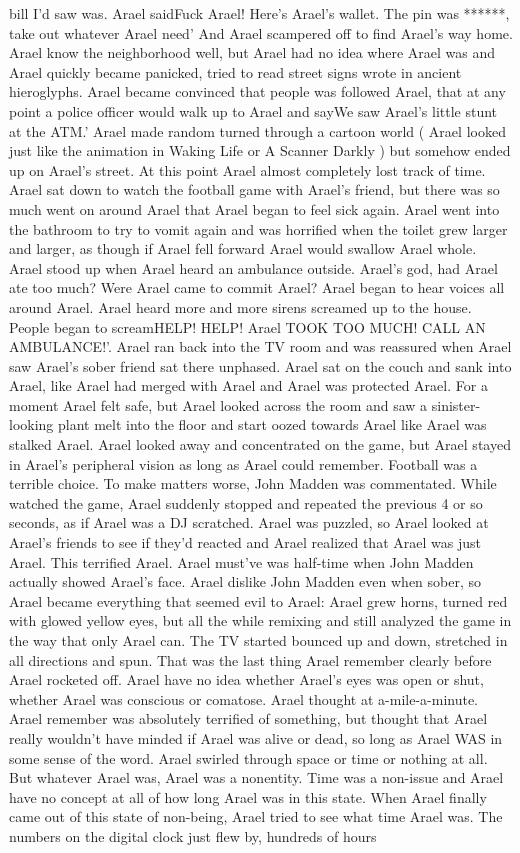 \documentclass[12pt]{book}
\begin{document}
bill I'd saw was. Arael saidFuck Arael! Here's Arael's wallet. The pin was ******, take out whatever Arael need' And Arael scampered off to find Arael's way home. Arael know the neighborhood well, but Arael had no idea where Arael was and Arael quickly became panicked, tried to read street signs wrote in ancient hieroglyphs. Arael became convinced that people was followed Arael, that at any point a police officer would walk up to Arael and sayWe saw Arael's little stunt at the ATM.' Arael made random turned through a cartoon world ( Arael looked just like the animation in Waking Life or A Scanner Darkly ) but somehow ended up on Arael's street. At this point Arael almost completely lost track of time. Arael sat down to watch the football game with Arael's friend, but there was so much went on around Arael that Arael began to feel sick again. Arael went into the bathroom to try to vomit again and was horrified when the toilet grew larger and larger, as though if Arael fell forward Arael would swallow Arael whole. Arael stood up when Arael heard an ambulance outside. Arael's god, had Arael ate too much? Were Arael came to commit Arael? Arael began to hear voices all around Arael. Arael heard more and more sirens screamed up to the house. People began to screamHELP! HELP! Arael TOOK TOO MUCH! CALL AN AMBULANCE!'. Arael ran back into the TV room and was reassured when Arael saw Arael's sober friend sat there unphased. Arael sat on the couch and sank into Arael, like Arael had merged with Arael and Arael was protected Arael. For a moment Arael felt safe, but Arael looked across the room and saw a sinister-looking plant melt into the floor and start oozed towards Arael like Arael was stalked Arael. Arael looked away and concentrated on the game, but Arael stayed in Arael's peripheral vision as long as Arael could remember. Football was a terrible choice. To make matters worse, John Madden was commentated. While watched the game, Arael suddenly stopped and repeated the previous 4 or so seconds, as if Arael was a DJ scratched. Arael was puzzled, so Arael looked at Arael's friends to see if they'd reacted and Arael realized that Arael was just Arael. This terrified Arael. Arael must've was half-time when John Madden actually showed Arael's face. Arael dislike John Madden even when sober, so Arael became everything that seemed evil to Arael: Arael grew horns, turned red with glowed yellow eyes, but all the while remixing and still analyzed the game in the way that only Arael can. The TV started bounced up and down, stretched in all directions and spun. That was the last thing Arael remember clearly before Arael rocketed off. Arael have no idea whether Arael's eyes was open or shut, whether Arael was conscious or comatose. Arael thought at a-mile-a-minute. Arael remember was absolutely terrified of something, but thought that Arael really wouldn't have minded if Arael was alive or dead, so long as Arael WAS in some sense of the word. Arael swirled through space or time or nothing at all. But whatever Arael was, Arael was a nonentity. Time was a non-issue and Arael have no concept at all of how long Arael was in this state. When Arael finally came out of this state of non-being, Arael tried to see what time Arael was. The numbers on the digital clock just flew by, hundreds of hours 
\end{document}

